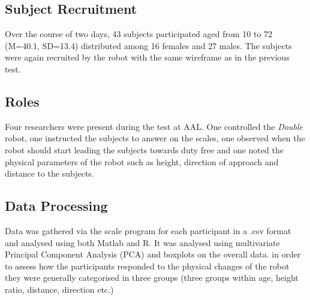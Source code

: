 \subsection{Subject Recruitment}
Over the course of two days, 43 subjects participated aged from 10 to 72 (M=40.1, SD=13.4) distributed among 16 females and 27 males. The subjects were again recruited by the robot with the same wireframe as in the previous test.

\subsection{Roles}
Four researchers were present during the test at AAL. One controlled the \textit{Double} robot, one instructed the subjects to answer on the scales, one observed when the robot should start leading the subjects towards duty free and one noted the physical parameters of the robot such as height, direction of approach and distance to the subjects.

\subsection{{\color{red}Data Processing}}
Data was gathered via the scale program for each participant in a .csv format and analysed using both Matlab and R. It was analysed using multivariate Principal Component Analysis (PCA) and boxplots on the overall data. in order to assess how the participants responded to the physical changes of the robot they were generally categorised in three groups (three groups within age, height ratio, distance, direction etc.)